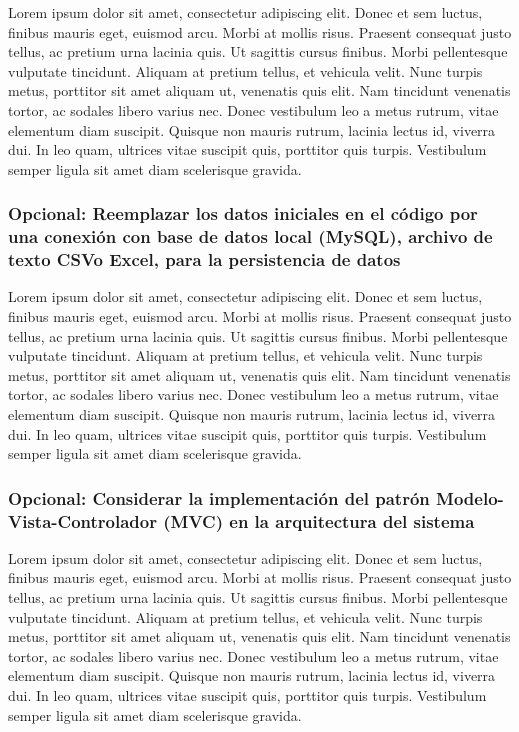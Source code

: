 Lorem ipsum dolor sit amet, consectetur adipiscing elit. Donec et sem luctus, finibus mauris eget, euismod arcu. Morbi at mollis risus. Praesent consequat justo tellus, ac pretium urna lacinia quis. Ut sagittis cursus finibus. Morbi pellentesque vulputate tincidunt. Aliquam at pretium tellus, et vehicula velit. Nunc turpis metus, porttitor sit amet aliquam ut, venenatis quis elit. Nam tincidunt venenatis tortor, ac sodales libero varius nec. Donec vestibulum leo a metus rutrum, vitae elementum diam suscipit. Quisque non mauris rutrum, lacinia lectus id, viverra dui. In leo quam, ultrices vitae suscipit quis, porttitor quis turpis. Vestibulum semper ligula sit amet diam scelerisque gravida.

\subsubsection*{Opcional: Reemplazar los datos iniciales en el código por una conexión con base de datos local (MySQL), archivo de texto CSVo Excel, para la persistencia de datos}

Lorem ipsum dolor sit amet, consectetur adipiscing elit. Donec et sem luctus, finibus mauris eget, euismod arcu. Morbi at mollis risus. Praesent consequat justo tellus, ac pretium urna lacinia quis. Ut sagittis cursus finibus. Morbi pellentesque vulputate tincidunt. Aliquam at pretium tellus, et vehicula velit. Nunc turpis metus, porttitor sit amet aliquam ut, venenatis quis elit. Nam tincidunt venenatis tortor, ac sodales libero varius nec. Donec vestibulum leo a metus rutrum, vitae elementum diam suscipit. Quisque non mauris rutrum, lacinia lectus id, viverra dui. In leo quam, ultrices vitae suscipit quis, porttitor quis turpis. Vestibulum semper ligula sit amet diam scelerisque gravida.


\subsubsection*{Opcional: Considerar la implementación del patrón Modelo-Vista-Controlador (MVC) en la arquitectura del sistema}

Lorem ipsum dolor sit amet, consectetur adipiscing elit. Donec et sem luctus, finibus mauris eget, euismod arcu. Morbi at mollis risus. Praesent consequat justo tellus, ac pretium urna lacinia quis. Ut sagittis cursus finibus. Morbi pellentesque vulputate tincidunt. Aliquam at pretium tellus, et vehicula velit. Nunc turpis metus, porttitor sit amet aliquam ut, venenatis quis elit. Nam tincidunt venenatis tortor, ac sodales libero varius nec. Donec vestibulum leo a metus rutrum, vitae elementum diam suscipit. Quisque non mauris rutrum, lacinia lectus id, viverra dui. In leo quam, ultrices vitae suscipit quis, porttitor quis turpis. Vestibulum semper ligula sit amet diam scelerisque gravida.
